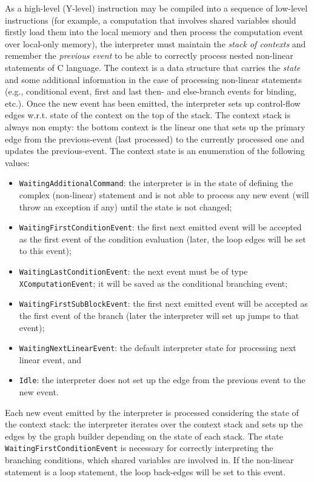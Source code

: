 As a high-level (Y-level) instruction may be compiled into a sequence of low-level instructions (for example, a computation that involves shared variables should firstly load them into the local memory and then process the computation event over local-only memory), the interpreter must maintain the \textit{stack of contexts} and remember the \textit{previous event} to be able to correctly process nested non-linear statements of C language.
The context is a data structure that carries the \textit{state} and some additional information in the case of processing non-linear statements (e.g., conditional event, first and last then- and else-branch events for binding, etc.).
Once the new event has been emitted, the interpreter sets up control-flow edges w.r.t. state of the context on the top of the stack.
The context stack is always non empty: the bottom context is the linear one that sets up the primary edge from the previous-event (last processed) to the currently processed one and updates the previous-event.
The context state is an enumeration of the following values:
\begin{itemize}[noitemsep,topsep=0pt]
\item \texttt{WaitingAdditionalCommand}: the interpreter is in the state of defining the complex (non-linear) statement and is not able to process any new event (will throw an exception if any) until the state is not changed;
\item \texttt{WaitingFirstConditionEvent}: the first next emitted event will be accepted as the first event of the condition evaluation (later, the loop edges will be set to this event);
\item \texttt{WaitingLastConditionEvent}: the next event must be of type \texttt{XComputationEvent}; it will be saved as the conditional branching event;
\item \texttt{WaitingFirstSubBlockEvent}: the first next emitted event will be accepted as the first event of the branch (later the interpreter will set up jumps to that event);
\item \texttt{WaitingNextLinearEvent}: the default interpreter state for processing next linear event, and
\item \texttt{Idle}: the interpreter does not set up the edge from the previous event to the new event.
\end{itemize}

Each new event emitted by the interpreter is processed considering the state of the context stack:
the interpreter iterates over the context stack and sets up the edges by the graph builder depending on the state of each stack.
The state \texttt{WaitingFirstConditionEvent} is necessary for correctly interpreting the branching conditions, which shared variables are involved in.
If the non-linear statement is a loop statement, the loop back-edges will be set to this event.

